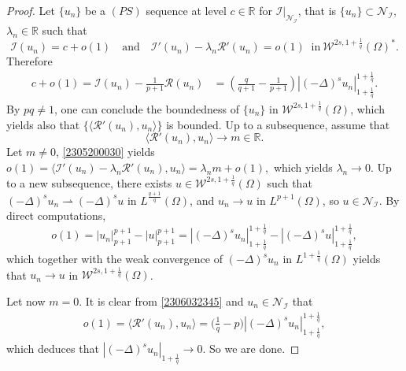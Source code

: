 \documentclass[10pt]{article}
\numberwithin{equation}{section}
\newcommand{\R}{\mathbb R}
\numberwithin{equation}{section}
\begin{document}
\begin{proof}
Let $\{u_n\}$ be a $(PS)$ sequence at level $c\in \mathbb{R}$ for $\mathcal{I}|_{\mathcal{N}_\mathcal{I}}$, that is $\{u_n\} \subset \mathcal{N}_\mathcal{I}$, $\lambda_n \in \R$ such that
\begin{equation}\label{2305200030}
\mathcal{I}(u_n)=c+o(1) \quad \mbox{and} \quad \mathcal{I}'(u_n)-\lambda_n\mathcal{R}'(u_n)=o(1)\;\; \text{in}~\mathcal{W}^{2s, 1+\frac1q}(\Omega)^*.
\end{equation}
Therefore
\[
\begin{aligned}
c+o(1) =\mathcal{I}(u_n)-\frac{1}{p+1}\mathcal{R}(u_n) &=\left(\frac{q}{q+1}-\frac{1}{p+1}\right)\left|(-\Delta)^su_n\right|_{1+\frac1q}^{1+\frac1q}.
\end{aligned}
\]
By $pq\neq 1$, one can conclude the boundedness of $\{u_n\}$ in $\mathcal{W}^{2s, 1+\frac1q}(\Omega)$, which yields also that $\{\langle \mathcal{R}'(u_n), u_n\rangle\}$ is bounded. Up to a subsequence, assume that
\begin{equation}\label{2306032345}
\langle \mathcal{R}'(u_n), u_n\rangle\to m \in \R.
\end{equation}
Let $m\neq 0$, \eqref{2305200030} yields $o(1)=\langle\mathcal{I}'(u_n)-\lambda_n\mathcal{R}'(u_n), u_n\rangle=\lambda_nm+o(1),$
which yields $\lambda_n\to 0$. Up to a new subsequence, there exists $u\in \mathcal{W}^{2s, 1+\frac1q}(\Omega)$ such that $(-\Delta)^su_n\rightharpoonup (-\Delta)^su$ in $L^{\frac{q+1}{q}}(\Omega)$,
and $u_n\to u$ in $L^{p+1}(\Omega)$, so $u\in \mathcal{N}_{\mathcal{I}}$. By direct computations,
\[
o(1)=|u_n|_{p+1}^{p+1}-|u|_{p+1}^{p+1}=\left|(-\Delta)^su_n\right|_{1+\frac1q}^{1+\frac1q}-\left|(-\Delta)^su\right|_{1+\frac1q}^{1+\frac1q},
\]
which together with the weak convergence of $(-\Delta)^s u_n$ in $L^{1 +\frac{1}{q}}(\Omega)$ yields that $u_n\to u$ in $\mathcal{W}^{2s, 1+\frac1q}(\Omega)$.\par

Let now $m=0$. It is clear from \eqref{2306032345} and $u_n\in \mathcal{N}_{\mathcal{I}}$ that
\[
\begin{aligned}
o(1)=\langle \mathcal{R}'(u_n), u_n\rangle=\Big(\frac{1}{q}-p\Big)\left|(-\Delta)^su_n\right|_{1+\frac1q}^{1+\frac1q},
\end{aligned}
\]
which deduces that $\left|(-\Delta)^su_n\right|_{1+\frac1q}\to 0.$ So we are done.
\end{proof}
\end{document}
